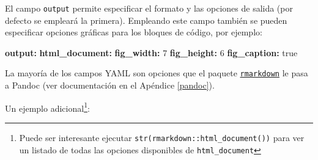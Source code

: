 \documentclass[
]{book}
\newenvironment{Shaded}{\begin{snugshade}}{\end{snugshade}}
\newcommand{\AttributeTok}[1]{\textcolor[rgb]{0.13,0.29,0.53}{#1}}
\newcommand{\CharTok}[1]{\textcolor[rgb]{0.31,0.60,0.02}{#1}}
\newcommand{\DecValTok}[1]{\textcolor[rgb]{0.00,0.00,0.81}{#1}}
\newcommand{\FunctionTok}[1]{\textcolor[rgb]{0.13,0.29,0.53}{\textbf{#1}}}
\newcommand{\KeywordTok}[1]{\textcolor[rgb]{0.13,0.29,0.53}{\textbf{#1}}}
\theoremstyle{break}
\theoremstyle{nonumberplain}
\let\oldfootnote\footnote
\renewcommand\footnote[1]{\oldfootnote{\hspace{2mm}#1}}
\begin{document}
El campo \texttt{output} permite especificar el formato y las opciones de salida (por defecto se empleará la primera). Empleando este campo también se pueden especificar opciones gráficas para los bloques de código, por ejemplo:

\begin{Shaded}
\begin{Highlighting}[]
\FunctionTok{output}\KeywordTok{:}
\AttributeTok{  }\FunctionTok{html\_document}\KeywordTok{:}
\AttributeTok{    }\FunctionTok{fig\_width}\KeywordTok{:}\AttributeTok{ }\DecValTok{7}
\AttributeTok{    }\FunctionTok{fig\_height}\KeywordTok{:}\AttributeTok{ }\DecValTok{6}
\AttributeTok{    }\FunctionTok{fig\_caption}\KeywordTok{:}\AttributeTok{ }\CharTok{true}
\end{Highlighting}
\end{Shaded}

La mayoría de los campos YAML son opciones que el paquete \href{https://github.com/rstudio/rmarkdown}{\texttt{rmarkdown}} le pasa a Pandoc (ver documentación en el Apéndice \ref{pandoc}).

Un ejemplo adicional\footnote{Puede ser interesante ejecutar \texttt{str(rmarkdown::html\_document())} para ver un listado de todas las opciones disponibles de \texttt{html\_document}}:
\end{document}

